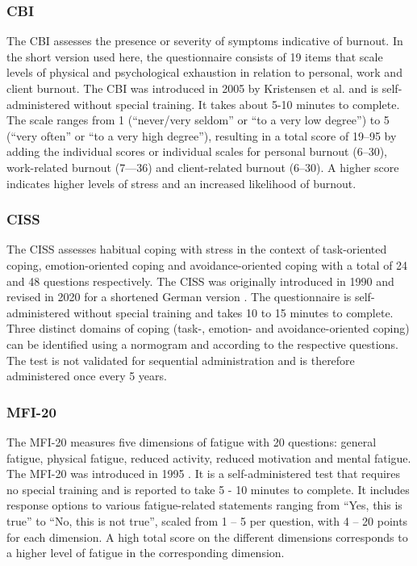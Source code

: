 \subsubsection{\acf{CBI}}
\label{questionnaires:CBI}
The \acl{CBI} assesses the presence or severity of symptoms indicative of burnout. In the short version used here, the questionnaire consists of 19 items that scale levels of physical and psychological exhaustion in relation to personal, work and client burnout. The CBI was introduced in 2005 by Kristensen et al. \cite{kristensen2005cbi} and is self-administered without special training. It takes about 5-10 minutes to complete. The scale ranges from 1 (``never/very seldom'' or ``to a very low degree'') to 5 (``very often'' or ``to a very high degree''), resulting in a total score of 19--95 by adding the individual scores or individual scales for personal burnout (6--30), work-related burnout (7---36) and client-related burnout (6--30). A higher score indicates higher levels of stress and an increased likelihood of burnout.

\QPsychometrics{}

\subsubsection{\acf{CISS}}
\label{questionnaires:CISS}
The \acl{CISS} assesses habitual coping with stress in the context of task-oriented coping, emotion-oriented coping and avoidance-oriented coping with a total of 24 and 48 questions respectively. The CISS was originally introduced in 1990 \cite{endler1990ciss} and revised in 2020 for a shortened German version \cite{kalin2020ciss}. The questionnaire is self-administered without special training and takes 10 to 15 minutes to complete. Three distinct domains of coping (task-, emotion- and avoidance-oriented coping) can be identified using a normogram and according to the respective questions. The test is not validated for sequential administration and is therefore administered once every 5 years.

\QPsychometrics{}

\subsubsection{\acf{MFI-20}}
\label{questionnaires:MFI20}
The \acl{MFI-20} measures five dimensions of fatigue with 20 questions: general fatigue, physical fatigue, reduced activity, reduced motivation and mental fatigue. The \acs{MFI-20} was introduced in 1995 \cite{smets1995mfi20}. It is a self-administered test that requires no special training and is reported to take 5 - 10 minutes to complete. It includes response options to various fatigue-related statements ranging from ``Yes, this is true'' to ``No, this is not true'', scaled from 1 -- 5 per question, with 4 -- 20 points for each dimension. A high total score on the different dimensions corresponds to a higher level of fatigue in the corresponding dimension.

